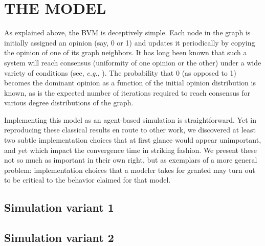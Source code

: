 
\section{THE MODEL}

As explained above, the BVM is deceptively simple. Each node in the graph is
initially assigned an opinion (say, 0 or 1) and updates it periodically by
copying the opinion of one of its graph neighbors. It has long been known that
such a system will reach consensus (uniformity of one opinion or the other)
under a wide variety of conditions (see, \textit{e.g.},
\cite{sood_voter_2005}). The probability that 0 (as opposed to 1) becomes the
dominant opinion as a function of the initial opinion distribution is known,
as is the expected number of iterations required to reach consensus for
various degree distributions of the graph.

Implementing this model as an agent-based simulation is straightforward. Yet
in reproducing these classical results en route to other work, we discovered
at least two subtle implementation choices that at first glance would appear
unimportant, and yet which impact the convergence time in striking fashion. We
present these not so much as important in their own right, but as exemplars of
a more general problem: implementation choices that a modeler takes for
granted may turn out to be critical to the behavior claimed for that model.

\subsection{Simulation variant 1}

\subsection{Simulation variant 2}



